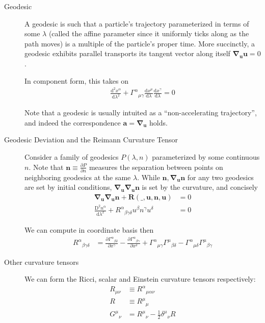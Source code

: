 \documentclass[12pt]{report}
\newcommand{\rd}[2]{\frac{\mathrm{d}#1}{\mathrm{d}#2}}
\newcommand{\pd}[2]{\frac{\partial#1}{\partial#2}}
\newcommand{\rtd}[2]{\frac{\mathrm{d}^2#1}{\mathrm{d}#2^2}}
\newcommand{\bm}[1]{\boldsymbol{\mathbf{#1}}}
\begin{document}
\begin{description}
    \item[Geodesic] A geodesic is such that a particle's trajectory
        parameterized in terms of some $\lambda$ (called the affine parameter
        since it uniformly ticks along as the path moves) is a multiple of the
        particle's proper time. More succinctly, a geodesic exhibits parallel
        transports its tangent vector along itself $\bm{\nabla}_{\bm{u}}\bm{u} =
        0$.

        In component form, this takes on
        \begin{align}
            \rtd{x^\alpha}{\lambda} + {\Gamma^\alpha}_{\mu\gamma}
                \rd{x^\mu}{\lambda}\rd{x^\gamma}{\lambda} = 0
        \end{align}

        Note that a geodesic is usually intuited as a ``non-accelerating
        trajectory'', and indeed the correspondence $\bm{a} =
        \bm{\nabla}_{\bm{u}}$ holds.

    \item[Geodesic Deviation and the Reimann Curvature Tensor] Consider a family
        of geodesics $P(\lambda, n)$ parameterized by some continuous $n$. Note
        that $\bm{n} \equiv \pd{P}{n}$ measures the separation between points on
        neighboring geodesics at the same $\lambda$. While $\bm{n},
        \bm{\nabla}_{\bm{u}}\bm{n}$ for any two geodesics are set by initial
        conditions, $\bm{\nabla}_{\bm{u}}\bm{\nabla}_{\bm{u}} \bm{n}$ is set by
        the curvature, and concisely
        \begin{align}
            \bm{\nabla}_{\bm{u}}\bm{\nabla}_{\bm{u}} \bm{n} + \bm{R}
                (\_, \bm{u}, \bm{n}, \bm{u}) &= 0\\
            \frac{\mathrm{D}^2 n^\alpha}{\mathrm{d}\lambda^2} +
                {R^\alpha}_{\beta\gamma\delta} u^\beta n^\gamma u^\delta &= 0
        \end{align}

        We can compute in coordinate basis then
        \begin{align*}
            {R^\alpha}_{\beta\gamma\delta} &=
                \pd{{\Gamma^\alpha}_{\beta\delta}}{x^\gamma} -
                \pd{{\Gamma^\alpha}_{\beta\gamma}}{x^\delta} +
                {\Gamma^\alpha}_{\mu\gamma} {\Gamma^\mu}_{\beta\delta} -
                {\Gamma^\alpha}_{\mu\delta} {\Gamma^\mu}_{\beta\gamma}
        \end{align*}

    \item[Other curvature tensors] We can form the Ricci, scalar and Einstein
        curvature tensors respectively:
        \begin{align}
            R_{\mu\nu} &\equiv {R^\alpha}_{\mu\alpha\nu}\\
            R &\equiv {R^\mu}_\mu\\
            {G^\mu}_{\nu} &= {R^\mu}_{\nu} - \frac{1}{2} {\delta^\mu}_\nu R
        \end{align}


\end{description}
\end{document}
